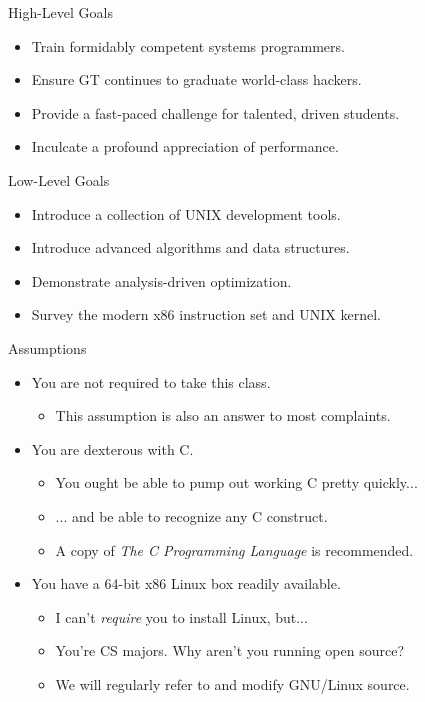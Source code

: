 \documentclass{beamer}
\begin{document}
\begin{frame}{High-Level Goals}
\begin{itemize}
\item Train formidably competent systems programmers.
\item Ensure GT continues to graduate world-class hackers.
\item Provide a fast-paced challenge for talented, driven students. 
\item Inculcate a profound appreciation of performance.
\end{itemize}
\end{frame}

\begin{frame}{Low-Level Goals}
\begin{itemize}
\item Introduce a collection of UNIX development tools.
\item Introduce advanced algorithms and data structures.
\item Demonstrate analysis-driven optimization.
\item Survey the modern x86 instruction set and UNIX kernel.
\end{itemize}
\end{frame}

\begin{frame}{Assumptions}
\begin{itemize}
\item You are not required to take this class.
\begin{itemize}
\item This assumption is also an answer to most complaints.
\end{itemize}
\item You are dexterous with C.
\begin{itemize}
\item You ought be able to pump out working C pretty quickly...
\item ... and be able to recognize any C construct.
\item A copy of {\it The C Programming Language} is recommended.
\end{itemize}
\item You have a 64-bit x86 Linux box readily available.
\begin{itemize}
\item I can't {\it require} you to install Linux, but...
\item You're CS majors. Why aren't you running open source?
\item We will regularly refer to and modify GNU/Linux source.
\end{itemize}
\end{itemize}
\end{frame}
\end{document}
